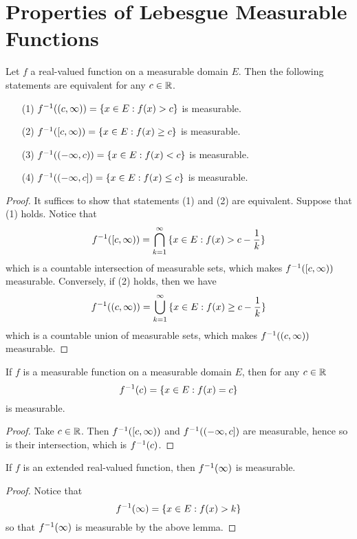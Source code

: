 \section{Properties of Lebesgue Measurable Functions}

\begin{lemma}\label{9.1.1}
    Let $f$ a real-valued function on a measurable domain $E$. Then the following
    statements are equivalent for any $c \in \mathbb{R}$.
    \begin{enumerate}
        \item[(1)] $f^{-1}((c,\infty))=\{x \in E : f(x)>c\}$ is measurable.

        \item[(2)] $f^{-1}([c,\infty))=\{x \in E : f(x)\geq c\}$ is measurable.

        \item[(3)] $f^{-1}((-\infty,c))=\{x \in E : f(x)<c\}$ is measurable.

        \item[(4)] $f^{-1}((-\infty,c])=\{x \in E : f(x) \leq c\}$ is measurable.
    \end{enumerate}
\end{lemma}
\begin{proof}
    It suffices to show that statements (1) and (2) are equivalent. Suppose that
    (1) holds. Notice that
    \begin{equation*}
        f^{-1}([c,\infty))=\bigcap_{k=1}^\infty{\{x \in E : f(x)>c-\frac{1}{k}\}}
    \end{equation*}
    which is a countable intersection of measurable sets, which makes
    $f^{-1}([c,\infty))$ measurable. Conversely, if (2) holds, then we have
    \begin{equation*}
        f^{-1}((c,\infty))=\bigcup_{k=1}^\infty{\{x \in E : f(x) \geq
        c-\frac{1}{k}\}}
    \end{equation*}
    which is a countable union of measurable sets, which makes
    $f^{-1}((c,\infty))$ measurable.
\end{proof}
\begin{corollary}
    If $f$ is a measurable function on a measurable domain $E$, then for any $c
    \in \mathbb{R}$
    \begin{equation*}
        f^{-1}(c)=\{x \in E : f(x)=c\}
    \end{equation*}
    is measurable.
\end{corollary}
\begin{proof}
    Take $c \in \mathbb{R}$. Then  $f^{-1}([c,\infty))$ and $f^{-1}((-\infty,c])$ are
    measurable, hence so is their intersection, which is $f^{-1}(c)$.
\end{proof}
\begin{corollary}
    If $f$ is an extended real-valued function, then  $f^{-1}(\infty)$ is
    measurable.
\end{corollary}
\begin{proof}
    Notice that
    \begin{equation*}
        f^{-1}(\infty)=\{x \in E : f(x)>k\}
    \end{equation*}
    so that $f^{-1}(\infty)$ is measurable by the above lemma.
\end{proof}

